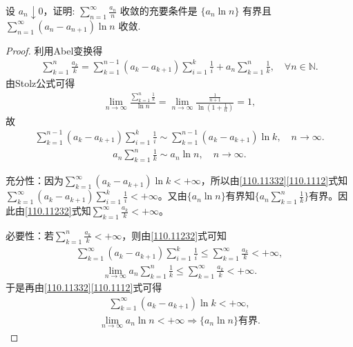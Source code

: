 \documentclass[../../main.tex]{subfiles}%
\begin{document}
\begin{example}
设 \( a_n \downarrow 0 \)，证明: \( \sum_{n=1}^{\infty} \frac{a_n}{n} \) 收敛的充要条件是 \( \{a_n \ln n\} \) 有界且 \( \sum_{n=1}^{\infty} (a_n - a_{n+1}) \ln n \) 收敛.
\end{example}
\begin{proof}

利用Abel变换得
\begin{align}
\sum_{k=1}^n{\frac{a_k}{k}}=\sum_{k=1}^{n-1}{\left( a_k-a_{k+1} \right) \sum_{i=1}^k{\frac{1}{i}}}+a_n\sum_{k=1}^n{\frac{1}{k}},\quad \forall n\in \mathbb{N} . \label{110.11232}
\end{align}
由Stolz公式可得
\begin{align*}
\lim_{n\rightarrow \infty}\frac{\sum\limits_{k=1}^n{\frac{1}{k}}}{\ln n}=\lim_{n\rightarrow \infty}\frac{\frac{1}{n+1}}{\ln \left( 1+\frac{1}{n} \right)}=1,
\end{align*}
故
\begin{align}
\sum_{k=1}^{n-1}{\left( a_k-a_{k+1} \right) \sum_{i=1}^k{\frac{1}{i}}}\sim \sum_{k=1}^{n-1}{\left( a_k-a_{k+1} \right) \ln k},\quad n\rightarrow \infty . \label{110.11332}
\end{align}
\begin{align}
a_n\sum_{k=1}^n{\frac{1}{k}}\sim a_n\ln n,\quad n\rightarrow \infty . \label{110.1112}
\end{align}

{\heiti 充分性}：因为$\sum_{k=1}^{\infty}{\left( a_k-a_{k+1} \right) \ln k}<+\infty$，所以由\eqref{110.11332}\eqref{110.1112}式知$\sum_{k=1}^{\infty}{\left( a_k-a_{k+1} \right) \sum_{i=1}^k{\frac{1}{i}}}<+\infty$。又由$\{ a_n\ln n \}$有界知$\{ a_n\sum_{k=1}^n{\frac{1}{k}} \}$有界。因此由\eqref{110.11232}式知$\sum_{k=1}^{\infty}{\frac{a_k}{k}}<+\infty$。

{\heiti 必要性}：若$\sum_{k=1}^n{\frac{a_k}{k}}<+\infty$，则由\eqref{110.11232}式可知
\begin{align*}
\sum_{k=1}^{\infty}{\left( a_k-a_{k+1} \right) \sum_{i=1}^k{\frac{1}{i}}}\leqslant \sum_{k=1}^{\infty}{\frac{a_k}{k}}<+\infty ,
\end{align*}
\begin{align*}
\lim_{n\rightarrow \infty}a_n\sum_{k=1}^n{\frac{1}{k}}\leqslant \sum_{k=1}^{\infty}{\frac{a_k}{k}}<+\infty .
\end{align*}
于是再由\eqref{110.11332}\eqref{110.1112}式可得
\begin{align*}
\sum_{k=1}^{\infty}{\left( a_k-a_{k+1} \right) \ln k}<+\infty ,
\end{align*}
\begin{align*}
\lim_{n\rightarrow \infty}a_n\ln n<+\infty \Longrightarrow \{ a_n\ln n \} \text{有界}.
\end{align*}

\end{proof}
\end{document}

